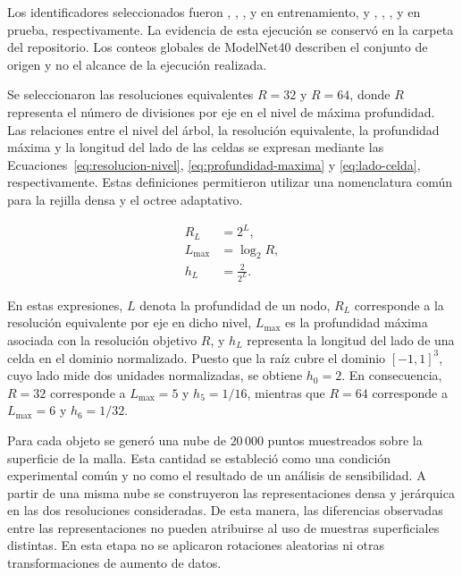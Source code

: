 Los identificadores seleccionados fueron \protect{}, \protect{}, \protect{}, \protect{} y \protect{} en entrenamiento, y \protect{}, \protect{}, \protect{}, \protect{} y \protect{} en prueba, respectivamente. La evidencia de esta ejecución se conservó en la carpeta \protect{} del repositorio. Los conteos globales de ModelNet40 describen el conjunto de origen y no el alcance de la ejecución realizada.

Se seleccionaron las resoluciones equivalentes $R=32$ y $R=64$, donde
$R$ representa el número de divisiones por eje en el nivel de máxima
profundidad. Las relaciones entre el nivel del árbol, la resolución
equivalente, la profundidad máxima y la longitud del lado de las celdas
se expresan mediante las Ecuaciones~\eqref{eq:resolucion-nivel},
\eqref{eq:profundidad-maxima} y \eqref{eq:lado-celda}, respectivamente.
Estas definiciones permitieron utilizar una nomenclatura común para la
rejilla densa y el octree adaptativo.

\begin{subequations}\label{eq:niveles}
\begin{align}
R_L &= 2^L,
\label{eq:resolucion-nivel}\\
L_{\max} &= \log_2 R,
\label{eq:profundidad-maxima}\\
h_L &= \frac{2}{2^L}.
\label{eq:lado-celda}
\end{align}
\end{subequations}

En estas expresiones, $L$ denota la profundidad de un nodo,
$R_L$ corresponde a la resolución equivalente por eje en dicho nivel,
$L_{\max}$ es la profundidad máxima asociada con la resolución objetivo
$R$, y $h_L$ representa la longitud del lado de una celda en el dominio
normalizado. Puesto que la raíz cubre el dominio $[-1,1]^3$, cuyo lado
mide dos unidades normalizadas, se obtiene $h_0=2$. En consecuencia,
$R=32$ corresponde a $L_{\max}=5$ y $h_5=1/16$, mientras que $R=64$
corresponde a $L_{\max}=6$ y $h_6=1/32$.

Para cada objeto se generó una nube de $20\,000$ puntos muestreados sobre la superficie de la malla. Esta cantidad se estableció como una condición experimental común y no como el resultado de un análisis de sensibilidad. A partir de una misma nube se construyeron las representaciones densa y jerárquica en las dos resoluciones consideradas. De esta manera, las diferencias observadas entre las representaciones no pueden atribuirse al uso de muestras superficiales distintas. En esta etapa no se aplicaron rotaciones aleatorias ni otras transformaciones de aumento de datos.


